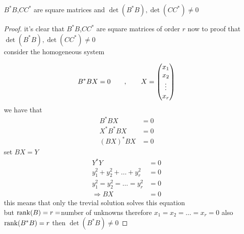 \documentclass[]{article}
\begin{document}
\begin{lemma}
        $B^{*}B$,$CC^{*}$ are square matrices and $\det(B^{*}B) ,\det(CC^{*}) \neq 0 $
\end{lemma}
\begin{proof}[Proof]
        it's clear that $B^{*}B$,$CC^{*}$ are square matrices of order $r$ now to proof that 
        $\det(B^{*}B) ,\det(CC^{*}) \neq 0 $\\
        consider the homogeneous system

        \[
        B^{*}B X = 0  \quad\quad,\quad\quad X = \begin{pmatrix}
        x_1\\
        x_2\\
        \vdots\\
        x_r\\
        \end{pmatrix}        
        \]
we have that 
        \begin{align*}
                B^{*}B X &= 0
                \\
                X^{*}B^{*}B X &= 0
                \\
                (BX)^{*}BX &= 0
        \end{align*}
set $BX = Y$
        \begin{align*}
                Y^{*}Y &= 0
                \\
                y_1^{2} + y_2^{2} + \dots + y_r^{2} &= 0
                \\
                y_1^{2} = y_2^{2} = \dots = y_r^{2} &= 0
                \\
                \Longrightarrow BX &= 0 
        \end{align*}
this means that only the trevial solution solves this equation
\\
but $\rank(B)=r=$number of unknowns therefore $x_1 = x_2 = \dots = x_r = 0$
also $\rank(B^{*}B)=r$ then $\det(B^{*}B) \neq 0$
\end{proof}
\end{document}
